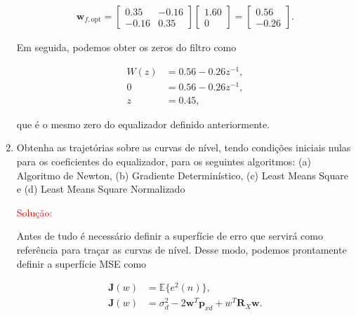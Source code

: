 \begin{enumerate}
        \begin{align}
            \mathbf{w}_{f,\text{opt}} = 
            \begin{bmatrix}
                0.35 & -0.16 \\
                -0.16 & 0.35
            \end{bmatrix}
            \begin{bmatrix}
                1.60 \\
                0
            \end{bmatrix} =
            \begin{bmatrix}
                0.56 \\
                -0.26
            \end{bmatrix}.
        \end{align}

        Em seguida, podemos obter os zeros do filtro como

        \begin{align}
            W(z) &= 0.56 - 0.26 z^{-1}, \\
            0 &= 0.56 - 0.26 z^{-1}, \\
            z &= 0.45,
        \end{align}

        que é o mesmo zero do equalizador definido anteriormente.

    \item Obtenha as trajetórias sobre as curvas de nível, tendo condições iniciais nulas para os coeﬁcientes do equalizador, para os seguintes algoritmos: (a) Algoritmo de Newton, (b) Gradiente Determinístico, (c) Least Means Square e (d) Least Means Square Normalizado
        
        \textcolor{red}{Solução:}
        
        Antes de tudo é necessário definir a superfície de erro que servirá como referência para traçar as curvas de nível. Desse modo, podemos prontamente
        definir a superfície MSE como
        
        \begin{align}
            \mathbf{J}(w) &= \mathbb{E}\{e^{2}(n)\}, \\
            \mathbf{J}(w) &= \sigma^{2}_{d} - 2\mathbf{w}^{T}\mathbf{p}_{xd} + w^{T}\mathbf{R}_{X}\mathbf{w}. \label{mseopt}  
        \end{align}
        

\end{enumerate}
